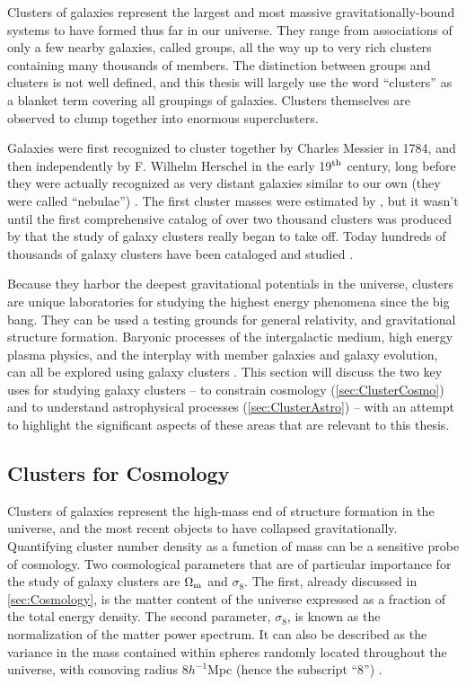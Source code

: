 Clusters of galaxies represent the largest and most massive gravitationally-bound systems to have formed thus far in our universe. They range from associations of only a few nearby galaxies, called groups, all the way up to very rich clusters containing many thousands of members. The distinction between groups and clusters is not well defined, and this thesis will largely use the word ``clusters'' as a blanket term covering all groupings of galaxies. Clusters themselves are observed to clump together into enormous superclusters.

Galaxies were first recognized to cluster together by Charles Messier in 1784, and then independently by F. Wilhelm Herschel in the early 19$^{\rm th}$ century, long before they were actually recognized as very distant galaxies similar to our own (they were called ``nebulae'') \citep{Biviano00}. The first cluster masses were estimated by \citet{Zwicky33}, but it wasn't until the first comprehensive catalog of over two thousand clusters was produced by \citet{Abell58} that the study of galaxy clusters really began to take off. Today hundreds of thousands of galaxy clusters have been cataloged and studied \citep[see e.g.][]{Wen12}.

Because they harbor the deepest gravitational potentials in the universe, clusters are unique laboratories for studying the highest energy phenomena since the big bang. They can be used a testing grounds for general relativity, and gravitational structure formation. Baryonic processes of the intergalactic medium, high energy plasma physics, and the interplay with member galaxies and galaxy evolution, can all be explored using galaxy clusters \citep{Kravtsov12}. This section will discuss the two key uses for studying galaxy clusters -- to constrain cosmology (\autoref{sec:ClusterCosmo}) and to understand astrophysical processes (\autoref{sec:ClusterAstro}) -- with an attempt to highlight the significant aspects of these areas that are relevant to this thesis.

\subsection{Clusters for Cosmology}
\label{sec:ClusterCosmo}
Clusters of galaxies represent the high-mass end of structure formation in the universe, and the most recent objects to have collapsed gravitationally. Quantifying cluster number density as a function of mass can be a sensitive probe of cosmology. Two cosmological parameters that are of particular importance for the study of galaxy clusters are $\Omega_{\rm m}$ and $\sigma_8$. The first, already discussed in \autoref{sec:Cosmology}, is the matter content of the universe expressed as a fraction of the total energy density. The second parameter, $\sigma_8$, is known as the normalization of the matter power spectrum. It can also be described as the variance in the mass contained within spheres randomly located throughout the universe, with comoving radius $8 h^{-1}$Mpc (hence the subscript ``8'') \citep{Voit05}.

